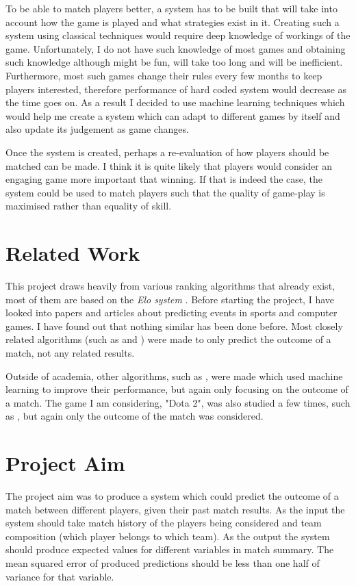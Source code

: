 \documentclass[12pt,a4paper]{book}
\begin{document}
To be able to match players better, a system has to be built that will take into account how the game is played and what strategies exist in it.
Creating such a system using classical techniques would require deep knowledge of workings of the game.
Unfortunately, I do not have such knowledge of most games and obtaining such knowledge although might be fun, will take too long and will be inefficient.
Furthermore, most such games change their rules every few months to keep players interested, therefore performance of hard coded system would decrease as the time goes on.
As a result I decided to use machine learning techniques which would help me create a system which can adapt to different games by itself and also update its judgement as game changes.

Once the system is created, perhaps a re-evaluation of how players should be matched can be made.
I think it is quite likely that players would consider an engaging game more important that winning.
If that is indeed the case, the system could be used to match players such that the quality of game-play is maximised rather than equality of skill.
\section{Related Work}
This project draws heavily from various ranking algorithms that already exist, most of them are based on the \emph{Elo system} \cite{elo}.
Before starting the project, I have looked into papers and articles about predicting events in sports and computer games.
I have found out that nothing similar has been done before.
Most closely related algorithms (such as \cite{trueskill} and \cite{bayesianranking}) were made to only predict the outcome of a match, not any related results.

Outside of academia, other algorithms, such as \cite{datainformed}, were made which used machine learning to improve their performance, but again only focusing on the outcome of a match.
The game I am considering, "Dota 2", was also studied a few times, such as \cite{agarwala2014learning}, but again only the outcome of the match was considered.

\section{Project Aim}
The project aim was to produce a system which could predict the outcome of a match between different players, given their past match results.
As the input the system should take match history of the players being considered and team composition (which player belongs to which team).
As the output the system should produce expected values for different variables in match summary.
The mean squared error of produced predictions should be less than one half of variance for that variable.
\end{document}
